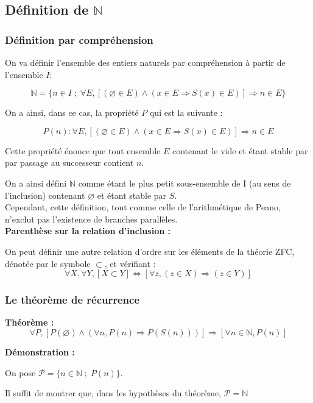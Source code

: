 \documentclass{article}
\begin{document}
\subsection{Définition de $\mathbb{N}$}

\subsubsection{Définition par compréhension}
On va définir l'ensemble des entiers naturels par compréhension à partir de l'ensemble $I$:

$$\boxed{\mathbb{N} = \{n \in I \; ; \; \forall E, [(\varnothing \in E) \wedge (x \in E \Rightarrow S(x) \in E)] \Rightarrow n \in E \}}$$

On a ainsi, dans ce cas, la propriété $P$ qui est la suivante :

$$P(n) : \forall E, [(\varnothing \in E) \wedge (x \in E \Rightarrow S(x) \in E)] \Rightarrow n \in E$$

Cette propriété énonce que tout ensemble $E$ contenant le vide et étant stable par par passage au successeur contient $n$. 

On a ainsi défini $\mathbb{N}$ comme étant le plus petit sous-ensemble de I (au sens de l'inclusion) contenant $\varnothing$ et étant stable par $S$.
\\

Cependant, cette définition, tout comme celle de l'arithmétique de Peano, n'exclut pas l'existence de branches parallèles.
\\

\textbf{Parenthèse sur la relation d'inclusion :}

On peut définir une autre relation d'ordre sur les éléments de la théorie ZFC, dénotée par le symbole $\subset$, et vérifiant :
$$\forall X, \forall Y, [X \subset Y] \Leftrightarrow [\forall z, (z \in X) \Rightarrow (z \in Y)]$$

\subsubsection{Le théorème de récurrence}

\textbf{Théorème :}
$$\forall P, [P(\varnothing) \wedge (\forall n, P(n) \Rightarrow P(S(n)))] \Rightarrow [\forall n \in \mathbb{N}, P(n)]$$

\textbf{Démonstration :}

On pose $\mathcal{P} = \{n \in \mathbb{N} \; ; \; P(n) \}$.

Il suffit de montrer que, dans les hypothèses du théorème, $\mathcal{P} = \mathbb{N}$
\end{document}
